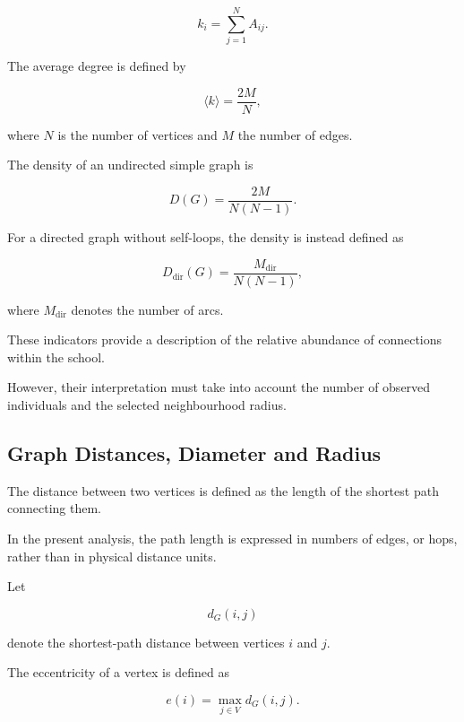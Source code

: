 \documentclass[10pt,a4paper]{article}
\begin{document}
\begin{equation}
k_i=\sum_{j=1}^{N}A_{ij}.
\end{equation}

The average degree is defined by

\begin{equation}
\langle k\rangle=\frac{2M}{N},
\end{equation}

where $N$ is the number of vertices and $M$ the
number of edges.

The density of an undirected simple graph is

\begin{equation}
D(G)=\frac{2M}{N(N-1)}.
\end{equation}

For a directed graph without self-loops, the density
is instead defined as

\begin{equation}
D_{\mathrm{dir}}(G)=
\frac{M_{\mathrm{dir}}}{N(N-1)},
\end{equation}

where $M_{\mathrm{dir}}$ denotes the number of arcs.

These indicators provide a description of the
relative abundance of connections within the school.

However, their interpretation must take into account
the number of observed individuals and the selected
neighbourhood radius.

\subsection{Graph Distances, Diameter and Radius}

The distance between two vertices is defined as the
length of the shortest path connecting them.

In the present analysis, the path length is expressed
in numbers of edges, or hops, rather than in physical
distance units.

Let

\begin{equation}
d_G(i,j)
\end{equation}

denote the shortest-path distance between vertices
$i$ and $j$.

The eccentricity of a vertex is defined as

\begin{equation}
e(i)=\max_{j\in V}d_G(i,j).
\end{equation}
\end{document}
